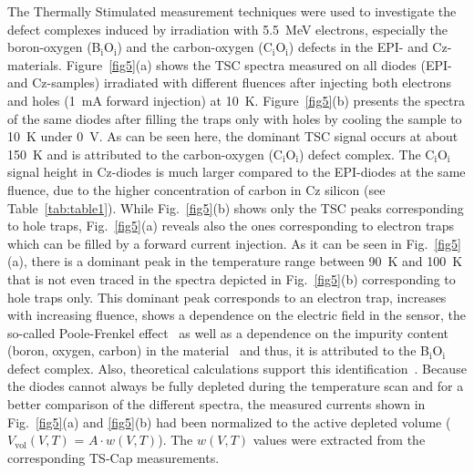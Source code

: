 \documentclass[final, 5p, times]{elsarticle}
\begin{document}
The Thermally Stimulated measurement techniques were used to investigate the defect complexes induced by irradiation with \SI{5.5}{\MeV} electrons, especially the boron-oxygen (B$_\text{i}$O$_\text{i}$) and the carbon-oxygen (C$_\text{i}$O$_\text{i}$) defects in the EPI- and Cz-materials. Figure~\ref{fig5}(a) shows the TSC spectra measured on all diodes (EPI- and Cz-samples) irradiated with different fluences after injecting both electrons and holes (1~mA forward injection) at 10~K. Figure~\ref{fig5}(b) presents the spectra of the same diodes after filling the traps only with holes by cooling the sample to 10~K under 0~V. As can be seen here, the dominant TSC signal occurs at about 150~K and is attributed to the carbon-oxygen (C$_\text{i}$O$_\text{i}$) defect complex. The C$_\text{i}$O$_\text{i}$ signal height in Cz-diodes is much larger compared to the EPI-diodes at the same fluence, due to the higher concentration of carbon in Cz silicon (see Table~\ref{tab:table1}). While Fig.~\ref{fig5}(b) shows only the TSC peaks corresponding to hole traps, Fig.~\ref{fig5}(a) reveals also the ones corresponding to electron traps which can be filled by a forward current injection. As it can be seen in Fig.~\ref{fig5}(a), there is a dominant peak in the temperature range between \SI{90}{\kelvin} and \SI{100}{\kelvin} that is not even traced in the spectra depicted in Fig.~\ref{fig5}(b) corresponding to hole traps only. This dominant peak corresponds to an electron trap, increases with increasing fluence, shows a dependence on the electric field in the sensor, the so-called Poole-Frenkel effect~\cite{b20,b28,b29} as well as a dependence on the impurity content (boron, oxygen, carbon) in the material~\cite{b9,b10,b30,b31} and thus, it is attributed to the B$_\text{i}$O$_\text{i}$ defect complex. Also, theoretical calculations support this identification~\cite{b31}. Because the diodes cannot always be fully depleted during the temperature scan and for a better comparison of the different spectra, the measured currents shown in Fig.~\ref{fig5}(a) and \ref{fig5}(b) had been normalized to the active depleted volume ($V_\text{vol}(V,T)$ = $A \cdot w(V,T)$). The $w(V, T)$ values were extracted from the corresponding TS-Cap measurements.
\par
\end{document}
